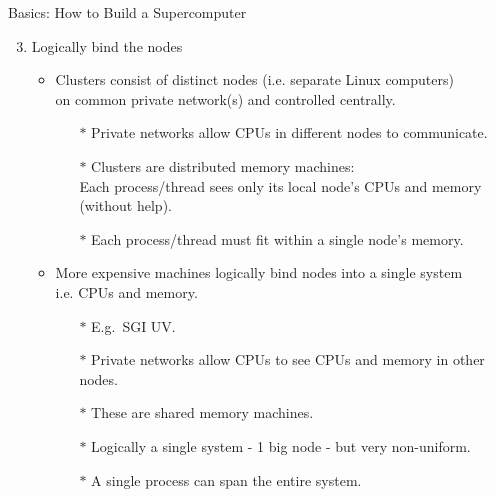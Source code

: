 \begin{frame}{Basics: How to Build a Supercomputer}
\begin{enumerate}
\setcounter{enumi}{2}
\item{Logically bind the nodes}
\begin{itemize}
\item{Clusters consist of distinct nodes (i.e. separate Linux computers)\hfill\\
on common private network(s) and controlled centrally.}
\begin{itemize}
\item[$\ast$]{Private networks allow CPUs in different nodes to communicate.}
\pause
\item[$\ast$]{Clusters are \alert{distributed memory} machines:\hfill\\
\alert{Each process/thread sees only its local node's CPUs and memory (without help).}}
\pause
\item[$\ast$]{\color{red}Each process/thread must fit within a single node's memory.}
\end{itemize}
\pause
\item{More expensive machines logically bind nodes into a single system\hfill\\
{}\qquad i.e. CPUs \alert{and} memory.}
\begin{itemize}
\item[$\ast$]{E.g.\ SGI UV.}
\item[$\ast$]{Private networks allow CPUs to see CPUs and memory in other nodes.}
\pause
\item[$\ast$]{These are \alert{shared memory} machines.}
\item[$\ast$]{Logically a single system - 1 big node - but very non-uniform.}
\item[$\ast$]{A single process can span the entire system.}
\end{itemize}
\end{itemize}
\end{enumerate}
\end{frame}


